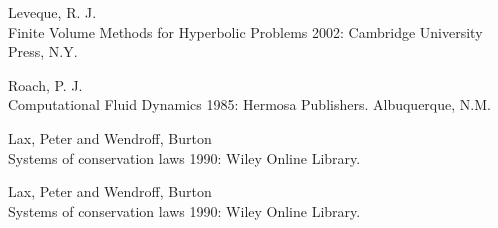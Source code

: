 




\begin{thebibliography}{1}

  Leveque, R. J. {\\Finite Volume Methods for Hyperbolic Problems} 2002:
Cambridge University Press, N.Y.

 Roach, P. J. {\\Computational Fluid Dynamics} 1985: Hermosa Publishers. Albuquerque, N.M.

 Lax, Peter and Wendroff, Burton {\\Systems of conservation laws} 1990: Wiley Online Library.

 Lax, Peter and Wendroff, Burton {\\Systems of conservation laws} 1990: Wiley Online Library.


\end{thebibliography}




